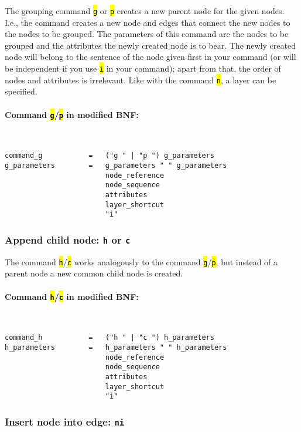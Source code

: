 \documentclass[12pt]{scrartcl}
\newcommand{\code}[1]{\hl{\texttt{#1}}}
\begin{document}
The grouping command \code{g} or \code{p} creates a new parent node for the given nodes.
I.e., the command creates a new node and edges that connect the new nodes to the nodes to be grouped.
The parameters of this command are the nodes to be grouped and the attributes the newly created node is to bear.
The newly created node will belong to the sentence of the node given first in your command (or will be independent if you use \code{i} in your command); apart from that, the order of nodes and attributes is irrelevant.
Like with the command \code{n}, a layer can be specified.

\paragraph*{Command \code{g}/\code{p} in modified BNF:}
~
\begin{lstlisting}
command_g           =   ("g " | "p ") g_parameters
g_parameters        =   g_parameters " " g_parameters
                        node_reference
                        node_sequence
                        attributes
                        layer_shortcut
                        "i"
\end{lstlisting}


\subsubsection{Append child node: \texttt{h} or \texttt{c}}

The command \code{h}/\code{c} works analogously to the command \code{g}/\code{p}, but instead of a parent node a new common child node is created.

\paragraph*{Command \code{h}/\code{c} in modified BNF:}
~
\begin{lstlisting}
command_h           =   ("h " | "c ") h_parameters
h_parameters        =   h_parameters " " h_parameters
                        node_reference
                        node_sequence
                        attributes
                        layer_shortcut
                        "i"
\end{lstlisting}


\subsubsection{Insert node into edge: \texttt{ni}}
\end{document}
